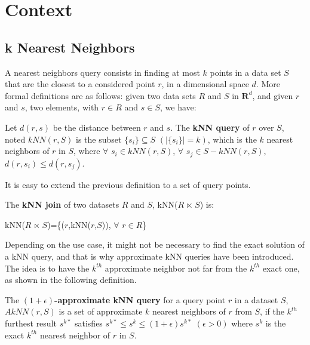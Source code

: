 \section{Context}
\subsection{k Nearest Neighbors}
A nearest neighbors query consists in finding at most $k$ points in a data set $S$ that are the closest to a considered point $r$, in a dimensional space $d$. More formal definitions are as follows: 
given two data sets $R$ and $S$ in $\mathbf{R}^d$, and given $r$ and $s$, two elements, with $r \in R$ and $s \in S$, we have:
%

\begin{myDef}
	Let $d(r,s)$ be the distance between $r$ and $s$. The \textbf{kNN query} of $r$ over $S$, noted $kNN(r,S)$ is the subset $\{s_i\} \subseteq S$ $\left(\left|\{s_i\}\right| = k\right)$, which is the $k$ nearest neighbors of $r$ in $S$, where $\forall$ $s_i \in kNN(r,S)$, $\forall$ $s_j \in S-kNN(r,S)$, $d(r,s_i) \leq d(r,s_j)$.
\end{myDef}

It is easy to extend the previous definition to a set of query points. 
\begin{myDef}
	The \textbf{kNN join} of two datasets $R$ and $S$, kNN($R$ $\ltimes$ $S$) is:
	\begin{center}
	kNN($R$ $\ltimes$ $S$)=\{($r$,kNN($r$,$S$)), $\forall$ $r \in R$\}
	\end{center}	
\end{myDef}
Depending on the use case, it might not be necessary to find the exact solution of a kNN query, and that is why approximate kNN queries have been introduced. The idea is to have the $k^{th}$ approximate neighbor not far from the $k^{th}$ exact one, as shown in the following definition. 
\begin{myDef}
    The \textbf{$\left(1+\epsilon\right)$-approximate kNN query} for a query point $r$ in a dataset $S$, $AkNN(r,S)$ is a set of approximate $k$ nearest neighbors of $r$ from $S$, if the $k^{th}$ furthest result $s^{k*}$ satisfies $s^{k*} \leq s^k \leq (1+\epsilon)s^{k*} $ $(\epsilon > 0)$ where $s^k$ is the exact $k^{th}$ nearest neighbor of $r$ in $S$.
\end{myDef}

